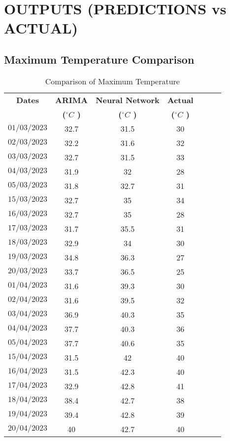 \chapter{OUTPUTS (PREDICTIONS vs ACTUAL)} 
\section{Maximum Temperature Comparison}
\begin{table}[h]
\centering
\caption{Comparison of Maximum Temperature}
\begin{tabular}{ccccccc}
\toprule
\textbf{Dates} & \textbf{ARIMA} & \textbf{Neural Network} & \textbf{Actual}   \\
\textbf{} & \textbf{($^{\circ}C$ )}       & \textbf{($^{\circ}C$ )}        & \textbf{($^{\circ}C$ )}  \\
\hline
$01/03/2023$ & 32.7 & 31.5 & 30 \\
\hline
$02/03/2023$ & 32.2 & 31.6 & 32 \\
\hline
$03/03/2023$ & 32.7 & 31.5 & 33 \\
\hline
$04/03/2023$ & 31.9 & 32 & 28 \\
\hline
$05/03/2023$ & 31.8 & 32.7 & 31 \\
\hline
$15/03/2023$ & 32.7 & 35 & 34 \\
\hline
$16/03/2023$ & 32.7 & 35 & 28 \\
\hline
$17/03/2023$ & 31.7 & 35.5 & 31 \\
\hline
$18/03/2023$ & 32.9 & 34 & 30 \\
\hline
$19/03/2023$ & 34.8 & 36.3 & 27 \\
\hline
$20/03/2023$ & 33.7 & 36.5 & 25 \\
\hline
$01/04/2023$ & 31.6 & 39.3 & 30 \\
\hline
$02/04/2023$ & 31.6 & 39.5 & 32 \\
\hline
$03/04/2023$ & 36.9 & 40.3 & 35 \\
\hline
$04/04/2023$ & 37.7 & 40.3 & 36 \\
\hline
$05/04/2023$ & 37.7 & 40.6 & 35 \\
\hline
$15/04/2023$ & 31.5 & 42 & 40 \\
\hline
$16/04/2023$ & 31.5 & 42.3 & 40 \\
\hline
$17/04/2023$ & 32.9 & 42.8 & 41 \\
\hline
$18/04/2023$ & 38.4 & 42.7 & 38 \\
\hline
$19/04/2023$ & 39.4 & 42.8 & 39 \\
\hline
$20/04/2023$ & 40 & 42.7 & 40\\
\bottomrule
\end{tabular}
\end{table}

